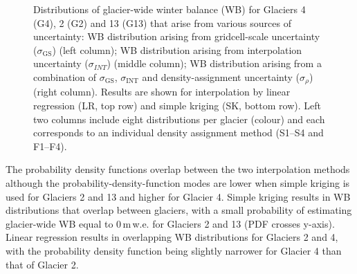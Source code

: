 \documentclass{sfuthesis}
\begin{document}
\begin{figure}[H]
	\centering
	\caption[Distributions of glacier-wide winter balance (WB) for study glaciers that arise from various sources of uncertainty]{Distributions of glacier-wide winter balance (WB) for Glaciers 4 (G4), 2 (G2) and 13 (G13) that arise from various sources of uncertainty: WB distribution arising from gridcell-scale uncertainty ($\sigma_{\mathrm{GS}}$) (left column); WB distribution arising from interpolation uncertainty ($\sigma_{INT}$) (middle column); WB distribution arising from a combination of $\sigma_{\mathrm{GS}}$, $\sigma_{\mathrm{INT}}$ and density-assignment uncertainty ($\sigma_{\rho}$) (right column). Results are shown for interpolation by linear regression (LR, top row) and simple kriging (SK, bottom row). Left two columns include eight distributions per glacier (colour) and each corresponds to an individual density assignment method (S1--S4 and F1--F4).}
	\label{fig:WSMBDist_LR}
\end{figure}

The probability density functions overlap between the two interpolation methods although the probability-density-function modes are lower when simple kriging is used for Glaciers 2 and 13 and higher for Glacier 4. Simple kriging results in WB distributions that overlap between glaciers, with a small probability of estimating glacier-wide WB equal to 0\,m\,w.e. for Glaciers 2 and 13 (PDF crosses y-axis). Linear regression results in overlapping WB distributions for Glaciers 2 and 4, with the probability density function being slightly narrower for Glacier 4 than that of Glacier 2. 
\end{document}
